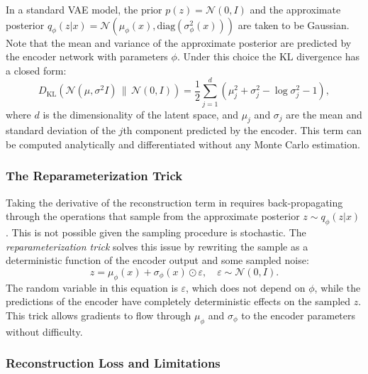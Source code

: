 In a standard VAE model, the prior $p(z) = \mathcal{N}(0, I)$ and the approximate posterior $q_\phi(z|x) = \mathcal{N}(\mu_\phi(x), \text{diag}(\sigma^2_\phi(x)))$ are taken to be Gaussian.
Note that the mean and variance of the approximate posterior are predicted by the encoder network with parameters $\phi$.
Under this choice the KL divergence has a closed form:
\begin{equation}
    D_\text{KL}\!\left(\mathcal{N}(\mu, \sigma^2 I) \,\|\, \mathcal{N}(0, I)\right)
    = \frac{1}{2} \sum_{j=1}^{d} \left(\mu_j^2 + \sigma_j^2 - \log \sigma_j^2 - 1\right),
    \label{eqn:kl_gaussian}
\end{equation}
where $d$ is the dimensionality of the latent space, and $\mu_j$ and $\sigma_j$ are the mean and standard deviation of the $j$th component predicted by the encoder.
This term can be computed analytically and differentiated without any Monte Carlo estimation.

\subsubsection{The Reparameterization Trick}

Taking the derivative of the reconstruction term in  requires back-propagating through the operations that sample from the approximate posterior $z \sim q_\phi(z|x)$.
This is not possible given the sampling procedure is stochastic.
The \textit{reparameterization trick} solves this issue by rewriting the sample as a deterministic function of the encoder output and some sampled noise:
\begin{equation}
    z = \mu_\phi(x) + \sigma_\phi(x) \odot \varepsilon, \quad \varepsilon \sim \mathcal{N}(0, I).
    \label{eqn:reparam}
\end{equation}
The random variable in this equation is $\varepsilon$, which does not depend on $\phi$, while the predictions of the encoder have completely deterministic effects on the sampled $z$.
This trick allows gradients to flow through $\mu_\phi$ and $\sigma_\phi$ to the encoder parameters without difficulty.

\subsubsection{Reconstruction Loss and Limitations}

